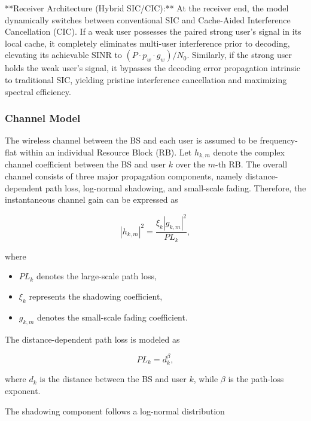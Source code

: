 \documentclass[12pt,a4paper]{article}
\begin{document}
**Receiver Architecture (Hybrid SIC/CIC):** At the receiver end, the model dynamically switches between conventional SIC and Cache-Aided Interference Cancellation (CIC). If a weak user possesses the paired strong user's signal in its local cache, it completely eliminates multi-user interference prior to decoding, elevating its achievable SINR to $(P \cdot p_w \cdot g_w) / N_0$. Similarly, if the strong user holds the weak user's signal, it bypasses the decoding error propagation intrinsic to traditional SIC, yielding pristine interference cancellation and maximizing spectral efficiency.
\subsubsection{Channel Model}

The wireless channel between the BS and each user is assumed to be frequency-flat within an individual Resource Block (RB). Let $h_{k,m}$ denote the complex channel coefficient between the BS and user $k$ over the $m$-th RB. The overall channel consists of three major propagation components, namely distance-dependent path loss, log-normal shadowing, and small-scale fading. Therefore, the instantaneous channel gain can be expressed as

\begin{equation}
|h_{k,m}|^2=
\frac{\xi_k |g_{k,m}|^2}
{PL_k},
\label{eq:channel_gain}
\end{equation}

where

\begin{itemize}
\item $PL_k$ denotes the large-scale path loss,
\item $\xi_k$ represents the shadowing coefficient,
\item $g_{k,m}$ denotes the small-scale fading coefficient.
\end{itemize}

The distance-dependent path loss is modeled as

\begin{equation}
PL_k=d_k^{\beta},
\label{eq:pathloss}
\end{equation}

where $d_k$ is the distance between the BS and user $k$, while $\beta$ is the path-loss exponent.

The shadowing component follows a log-normal distribution
\end{document}
